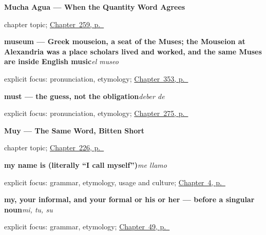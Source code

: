 \noindent\begin{minipage}[t]{\linewidth}
\raggedright
\textbf{Mucha Agua --- When the Quantity Word Agrees}\par
\footnotesize chapter topic; \hyperref[ch:mucha-agua]{Chapter~259, p.~\pageref*{ch:mucha-agua}}
\end{minipage}\par\smallskip

\noindent\begin{minipage}[t]{\linewidth}
\raggedright
\textbf{museum — Greek mouseion, a seat of the Muses; the Mouseion at Alexandria was a place scholars lived and worked, and the same Muses are inside English music}\enspace\emph{el museo}\par
\footnotesize explicit focus: pronunciation, etymology; \hyperref[ch:el-hospital-y-el-banco]{Chapter~353, p.~\pageref*{ch:el-hospital-y-el-banco}}
\end{minipage}\par\smallskip

\noindent\begin{minipage}[t]{\linewidth}
\raggedright
\textbf{must — the guess, not the obligation}\enspace\emph{deber de}\par
\footnotesize explicit focus: pronunciation, etymology; \hyperref[ch:matices]{Chapter~275, p.~\pageref*{ch:matices}}
\end{minipage}\par\smallskip

\noindent\begin{minipage}[t]{\linewidth}
\raggedright
\textbf{Muy --- The Same Word, Bitten Short}\par
\footnotesize chapter topic; \hyperref[ch:muy]{Chapter~226, p.~\pageref*{ch:muy}}
\end{minipage}\par\smallskip

\noindent\begin{minipage}[t]{\linewidth}
\raggedright
\textbf{my name is (literally \textquotedblleft{}I call myself\textquotedblright{})}\enspace\emph{me llamo}\par
\footnotesize explicit focus: grammar, etymology, usage and culture; \hyperref[ch:your-name]{Chapter~4, p.~\pageref*{ch:your-name}}
\end{minipage}\par\smallskip

\noindent\begin{minipage}[t]{\linewidth}
\raggedright
\textbf{my, your informal, and your formal or his or her — before a singular noun}\enspace\emph{mi, tu, su}\par
\footnotesize explicit focus: grammar, etymology; \hyperref[ch:ir-y-futuro]{Chapter~49, p.~\pageref*{ch:ir-y-futuro}}
\end{minipage}\par\smallskip

